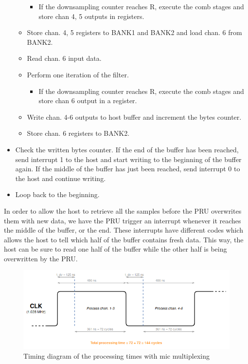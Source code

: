 \documentclass[]{report}
\providecommand{\tightlist}{%
	\setlength{\itemsep}{0pt}\setlength{\parskip}{0pt}}
\begin{document}
\begin{itemize}
\begin{itemize}
    \begin{itemize}
    \tightlist
    \item
      If the downsampling counter reaches R, execute the comb stages and
      store chan 4, 5 outputs in registers.
    \end{itemize}
  \item
    Store chan. 4, 5 registers to BANK1 and BANK2 and load chan. 6 from
    BANK2.
  \item
    Read chan. 6 input data.
  \item
    Perform one iteration of the filter.

    \begin{itemize}
    \tightlist
    \item
      If the downsampling counter reaches R, execute the comb stages and
      store chan 6 output in a register.
    \end{itemize}
  \item
    Write chan. 4-6 outputs to host buffer and increment the bytes counter.
  \item
    Store chan. 6 registers to BANK2.
  \end{itemize}
\item
  Check the written bytes counter. If the end of the buffer has been
  reached, send interrupt 1 to the host and start writing to the
  beginning of the buffer again. If the middle of the buffer has just
  been reached, send interrupt 0 to the host and continue writing.
\item
  Loop back to the beginning.
\end{itemize}

In order to allow the host to retrieve all the samples before the PRU overwrites them with new data, we have the PRU trigger an interrupt whenever it reaches the middle of the buffer, or the end. These interrupts have different codes which allows the host to tell which half of the buffer contains fresh data. This way, the host can be sure to read one half of the buffer while the other half is being overwritten by the PRU.

\begin{figure}[h]
\centering
\includegraphics[width=1.0\linewidth]{Pictures/PRU_timing_diagram_mic_multiplexing.png}
\caption{Timing diagram of the processing times with mic multiplexing}
\label{fig:multiplex-mics}
\end{figure}
\end{document}
